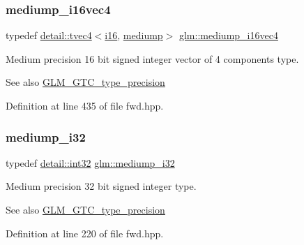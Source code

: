 \subsubsection{\texorpdfstring{mediump\+\_\+i16vec4}{mediump\_i16vec4}}
{\footnotesize\ttfamily typedef \hyperlink{structglm_1_1detail_1_1tvec4}{detail\+::tvec4}$<$\hyperlink{group__gtc__type__precision_ga35e5542ca05b29cc256fdafb8503d1fd}{i16}, \hyperlink{namespaceglm_a0f04f086094c747d227af4425893f545a6416f3ea0c9025fb21ed50c4d6620482}{mediump}$>$ \hyperlink{group__gtc__type__precision_gad9aca299fc3e96c84be6b063381c9f3e}{glm\+::mediump\+\_\+i16vec4}}

Medium precision 16 bit signed integer vector of 4 components type. \begin{DoxySeeAlso}{See also}
\hyperlink{group__gtc__type__precision}{G\+L\+M\+\_\+\+G\+T\+C\+\_\+type\+\_\+precision} 
\end{DoxySeeAlso}


Definition at line 435 of file fwd.\+hpp.

\mbox{\label{group__gtc__type__precision_ga5e00ec824eb55968a6b6496f294d8c07}} 
\subsubsection{\texorpdfstring{mediump\+\_\+i32}{mediump\_i32}}
{\footnotesize\ttfamily typedef \hyperlink{namespaceglm_1_1detail_a9f85b4efeca416cdcec2fd08939a2e17}{detail\+::int32} \hyperlink{group__gtc__type__precision_ga5e00ec824eb55968a6b6496f294d8c07}{glm\+::mediump\+\_\+i32}}

Medium precision 32 bit signed integer type. \begin{DoxySeeAlso}{See also}
\hyperlink{group__gtc__type__precision}{G\+L\+M\+\_\+\+G\+T\+C\+\_\+type\+\_\+precision} 
\end{DoxySeeAlso}


Definition at line 220 of file fwd.\+hpp.

\mbox{\label{group__gtc__type__precision_ga44c6a3b78e635d91e35e1c41ab6b0ba1}} 
